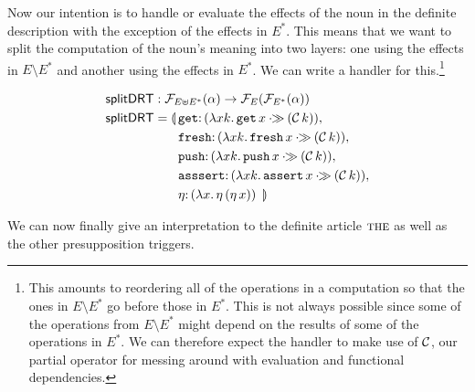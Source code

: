 Now our intention is to handle or evaluate the effects of the noun in the
definite description with the exception of the effects in $E^*$. This means
that we want to split the computation of the noun's meaning into two
layers: one using the effects in $E \setminus E^*$ and another using the
effects in $E^*$. We can write a handler for this.\footnote{This amounts to
  reordering all of the operations in a computation so that the ones in
  $E \setminus E^*$ go before those in $E^*$. This is not always possible
  since some of the operations from $E \setminus E^*$ might depend on the
  results of some of the operations in $E^*$. We can therefore expect the
  handler to make use of $\mathcal{C}$, our partial operator for messing around
  with evaluation and functional dependencies.}

\begin{align*}
  \splitDRT &: \FF_{E \uplus E^*}(\alpha) \to \FF_E(\FF_{E^*}(\alpha)) \\
  \splitDRT &= \lban \begin{aligned}[t]
      &\onto{\op{get}}{(\lam{x k}{\ap{\op{get}}{x} \apr (\ap{\CC}{k})})}, \\
      &\onto{\op{fresh}}{(\lam{x k}{\ap{\op{fresh}}{x} \apr (\ap{\CC}{k})})}, \\
      &\onto{\op{push}}{(\lam{x k}{\ap{\op{push}}{x} \apr (\ap{\CC}{k})})}, \\
      &\onto{\op{asssert}}{(\lam{x k}{\ap{\op{assert}}{x} \apr (\ap{\CC}{k})})}, \\
      &\onto{\eta}{(\lam{x}{\etaE{(\etaE{x})}})}\ \rban
    \end{aligned}
\end{align*}

We can now finally give an interpretation to the definite article
$\textsc{the}$ as well as the other presupposition triggers.

